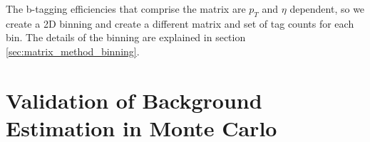 The b-tagging efficiencies that comprise the matrix are $p_T$ and $\eta$ dependent, so we create a 2D binning and create a different matrix and set of tag counts for each bin.  The details of the binning are explained in section \ref{sec:matrix_method_binning}.


\section{Validation of Background Estimation in Monte Carlo}



















%
%


